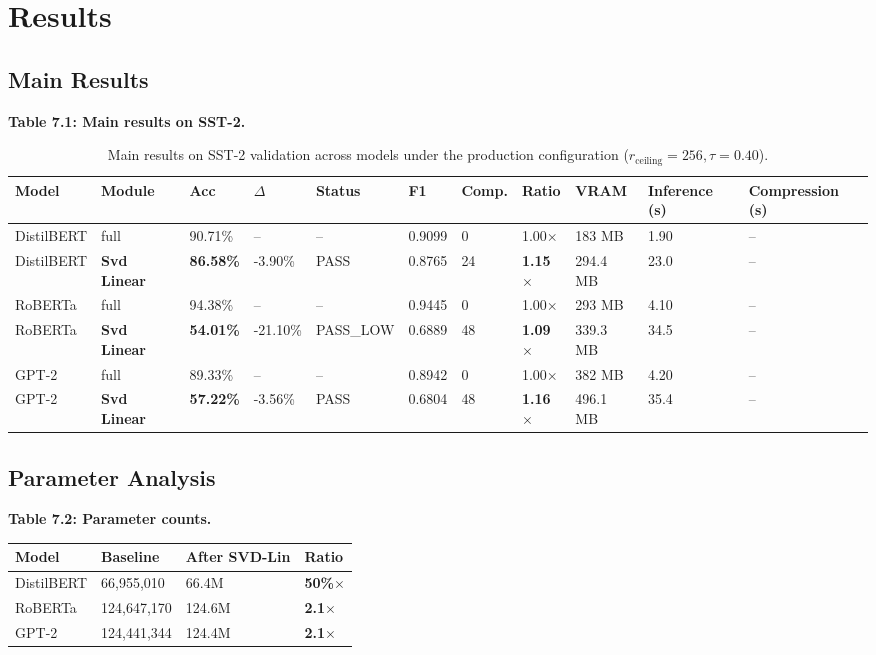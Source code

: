 
\section{Results}

\subsection{Main Results}

\textbf{Table 7.1: Main results on SST-2.}

\begin{table}[t]
\centering
\small
\begin{tabular}{lllllllllll}
\toprule
\textbf{Model} & \textbf{Module} & \textbf{Acc} & \textbf{$\Delta$} & \textbf{Status} & \textbf{F1} & \textbf{Comp.} & \textbf{Ratio} & \textbf{VRAM} & \textbf{Inference (s)} & \textbf{Compression (s)} \\
\midrule
DistilBERT & full & 90.71\% & -- & -- & 0.9099 & 0 & 1.00$\times$ & 183 MB & 1.90 & -- \\
DistilBERT & \textbf{Svd Linear} & \textbf{86.58\%} & -3.90\% & PASS & 0.8765 & 24 & \textbf{1.15$\times$} & 294.4 MB & 23.0 & -- \\
RoBERTa & full & 94.38\% & -- & -- & 0.9445 & 0 & 1.00$\times$ & 293 MB & 4.10 & -- \\
RoBERTa & \textbf{Svd Linear} & \textbf{54.01\%} & -21.10\% & PASS\_LOW & 0.6889 & 48 & \textbf{1.09$\times$} & 339.3 MB & 34.5 & -- \\
GPT-2 & full & 89.33\% & -- & -- & 0.8942 & 0 & 1.00$\times$ & 382 MB & 4.20 & -- \\
GPT-2 & \textbf{Svd Linear} & \textbf{57.22\%} & -3.56\% & PASS & 0.6804 & 48 & \textbf{1.16$\times$} & 496.1 MB & 35.4 & -- \\
\bottomrule
\end{tabular}
\caption{Main results on SST-2 validation across models under the production configuration ($r_{\mathrm{ceiling}}=256, \tau=0.40$).}
\label{tab:main_sst2}
\end{table}

\subsection{Parameter Analysis}

\textbf{Table 7.2: Parameter counts.}

\begin{table}[H]
\centering
\small
\begin{tabular}{llll}
\toprule
\textbf{Model} & \textbf{Baseline} & \textbf{After SVD-Lin} & \textbf{Ratio} \\
\midrule
DistilBERT & 66,955,010 & 66.4M & \textbf{50\%$\times$} \\
RoBERTa & 124,647,170 & 124.6M & \textbf{2.1$\times$} \\
GPT-2 & 124,441,344 & 124.4M & \textbf{2.1$\times$} \\
\bottomrule
\end{tabular}
\end{table}

